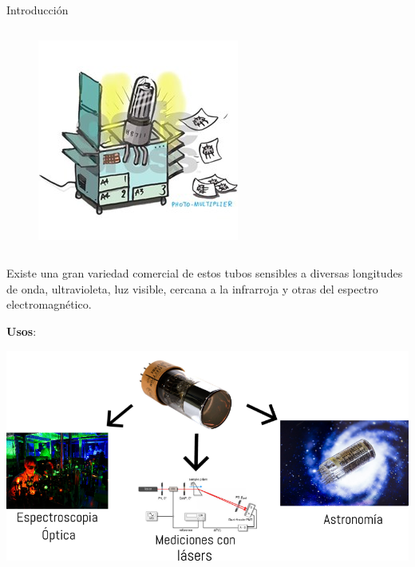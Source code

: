 \documentclass[a4paper,10pt]{beamer}
\begin{document}
\begin{frame}[allowframebreaks]{Introducción}
\begin{justify}
\begin{columns}[c]
 \begin{figure}
  \center 
  \includegraphics[scale=0.83]{fig0}
 \end{figure}

 
 \end{columns}
\framebreak

 Existe una gran variedad comercial de estos tubos sensibles a diversas longitudes de onda,
 ultravioleta, luz visible, cercana a la infrarroja y otras del espectro electromagnético.
 
 \vspace{.3cm}
 
 \textbf{Usos}:
 
 \begin{center}
   \includegraphics[scale=0.34]{fig1}
 \end{center}

 
 \end{justify}
\end{frame}
\end{document}
